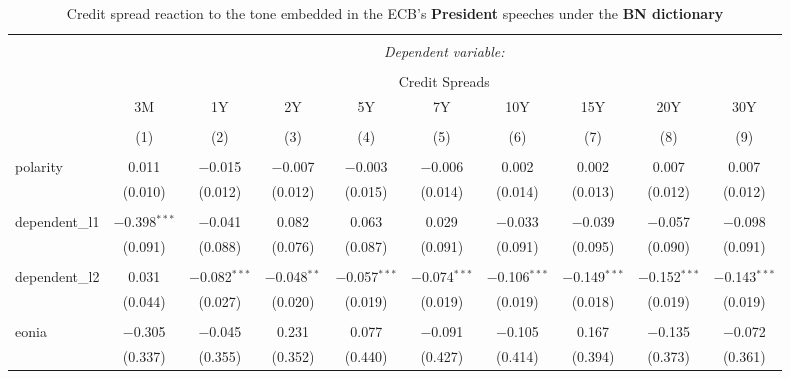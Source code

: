 

\begin{table}[!htbp] \centering 
  \caption[BN Tone \& Credit Spread: president speeches]{Credit spread reaction to the tone embedded in the ECB's \textbf{President} speeches under the \textbf{BN dictionary}} 
  \label{tab:spreads_president_bn} 
  \begin{adjustbox}{width=1.25\textwidth}
\begin{tabular}{@{\extracolsep{5pt}}lccccccccc} 
\\[-1.8ex]\hline 
\hline \\[-1.8ex] 
 & \multicolumn{9}{c}{\textit{Dependent variable:}} \\ 
\cline{2-10} 
\\[-1.8ex] & \multicolumn{9}{c}{Credit Spreads} \\ 
 & 3M & 1Y & 2Y & 5Y & 7Y & 10Y & 15Y & 20Y & 30Y \\ 
\\[-1.8ex] & (1) & (2) & (3) & (4) & (5) & (6) & (7) & (8) & (9)\\ 
\hline \\[-1.8ex] 
 polarity & 0.011 & $-$0.015 & $-$0.007 & $-$0.003 & $-$0.006 & 0.002 & 0.002 & 0.007 & 0.007 \\ 
  & (0.010) & (0.012) & (0.012) & (0.015) & (0.014) & (0.014) & (0.013) & (0.012) & (0.012) \\ 
  & & & & & & & & & \\ 
 dependent\_l1 & $-$0.398$^{***}$ & $-$0.041 & 0.082 & 0.063 & 0.029 & $-$0.033 & $-$0.039 & $-$0.057 & $-$0.098 \\ 
  & (0.091) & (0.088) & (0.076) & (0.087) & (0.091) & (0.091) & (0.095) & (0.090) & (0.091) \\ 
  & & & & & & & & & \\ 
 dependent\_l2 & 0.031 & $-$0.082$^{***}$ & $-$0.048$^{**}$ & $-$0.057$^{***}$ & $-$0.074$^{***}$ & $-$0.106$^{***}$ & $-$0.149$^{***}$ & $-$0.152$^{***}$ & $-$0.143$^{***}$ \\ 
  & (0.044) & (0.027) & (0.020) & (0.019) & (0.019) & (0.019) & (0.018) & (0.019) & (0.019) \\ 
  & & & & & & & & & \\ 
 eonia & $-$0.305 & $-$0.045 & 0.231 & 0.077 & $-$0.091 & $-$0.105 & 0.167 & $-$0.135 & $-$0.072 \\ 
  & (0.337) & (0.355) & (0.352) & (0.440) & (0.427) & (0.414) & (0.394) & (0.373) & (0.361) \\ 

\end{tabular}
\end{adjustbox}
\end{table}
